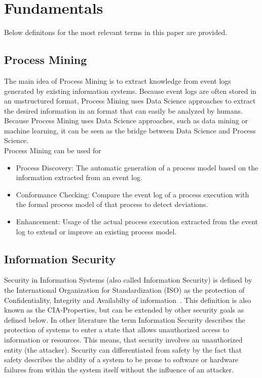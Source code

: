 \documentclass[runningheads]{llncs}
\begin{document}
\section{Fundamentals}\label{Fundamentals}
Below definitons for the most relevant terms in this paper are provided.
\subsection{Process Mining}\label{Process Mining}
The main idea of Process Mining is to extract knowledge from event logs generated by existing information systems. Because event logs are often stored in an unstructured format, Process Mining uses Data Science approaches to
extract the desired information in an format that can easily be analyzed by humans.\cite{vanderAalst2016} Because Process Mining uses Data Science approaches, such as data mining or machine learning, it can be seen as the bridge between Data Science and Process Science.\\
Process Mining can be used for
\begin{itemize}
    \item Process Discovery: The automatic generation of a process model based on the information extracted from an event log.
    \item Conformance Checking: Compare the event log of a process execution with the formal process model of that process to detect deviations.
    \item Enhancement: Usage of the actual process execution extracted from the event log to extend or improve an existing process model.
\end{itemize}

\subsection{Information Security}\label{Security}
Security in Information Systems (also called Information Security) is defined by the International Organization for Standardization (ISO) as the protection of 
Confidentiality, Integrity and Availabilty of information~\cite{ISO}. This definition is also known as the CIA-Properties, but can be extended by other security goals as defined below. In other
literature the term Information Security describes the protection of systems to enter a state that allows unauthorized access to information or resources. This means, that security involves an
unauthorized entity (the attacker). Security can differentiated from safety by the fact that safety describes the ability of a system to be prone to software or hardware failures from within
the system itself without the influence of an attacker.\cite{Eckert}\\
\end{document}

